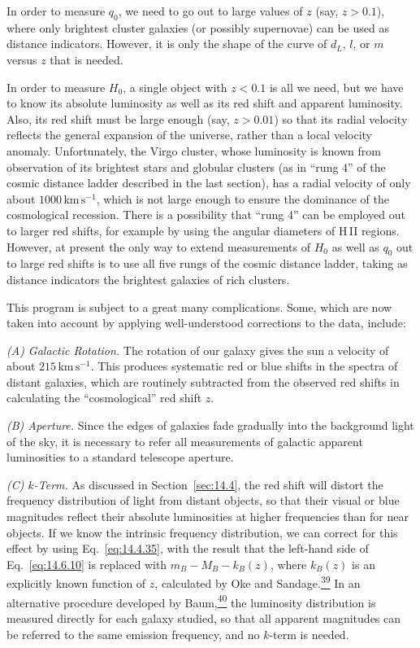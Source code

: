 In order to measure \(q_0\), we need to go out to large values of \(z\)
(say, \(z>0.1\)), where only brightest cluster galaxies (or possibly
supernovae) can be used as distance indicators. However, it is only the
shape of the curve of \(d_L\), \(l\), or \(m\) versus \(z\) that is needed.

In order to measure \(H_0\), a single object with \(z<0.1\) is all we need,
but we have to know its absolute luminosity as well as its red shift and
apparent luminosity. Also, its red shift must be large enough (say,
\(z>0.01\)) so that its radial velocity reflects the general expansion of
the universe, rather than a local velocity anomaly. Unfortunately, the Virgo
cluster, whose luminosity is known from observation of its brightest stars
and globular clusters (as in ``rung 4'' of the cosmic distance ladder
described in the last section), has a radial velocity of only about
\(1000\,\mathrm{km\,s^{-1}}\), which is not large enough to ensure the
dominance of the cosmological recession. There is a possibility that
``rung 4'' can be employed out to larger red shifts, for example by using the
angular diameters of H\,II regions. However, at present the only way to
extend measurements of \(H_0\) as well as \(q_0\) out to large red shifts is
to use all five rungs of the cosmic distance ladder, taking as distance
indicators the brightest galaxies of rich clusters.

This program is subject to a great many complications. Some, which are now
taken into account by applying well-understood corrections to the data,
include:

\medskip
\noindent\textit{(A) Galactic Rotation.}
The rotation of our galaxy gives the sun a velocity of about
\(215\,\mathrm{km\,s^{-1}}\). This produces systematic red or blue shifts
in the spectra of distant galaxies, which are routinely subtracted from the
observed red shifts in calculating the ``cosmological'' red shift \(z\).

\medskip
\noindent\textit{(B) Aperture.}
Since the edges of galaxies fade gradually into the background light of the
sky, it is necessary to refer all measurements of galactic apparent
luminosities to a standard telescope aperture.

\medskip
\noindent\textit{(C) \(k\)-Term.}
As discussed in Section~\ref{sec:14.4}, the red shift will distort the
frequency distribution of light from distant objects, so that their visual
or blue magnitudes reflect their absolute luminosities at higher frequencies
than for near objects. If we know the intrinsic frequency distribution, we
can correct for this effect by using Eq.~\eqref{eq:14.4.35}, with the result
that the left-hand side of Eq.~\eqref{eq:14.6.10} is replaced with
\(m_B-M_B-k_B(z)\), where \(k_B(z)\) is an explicitly known function of
\(z\), calculated by Oke and
Sandage.\hyperref[ch14-ref-39]{\textsuperscript{39}} In an alternative
procedure developed by Baum,\hyperref[ch14-ref-40]{\textsuperscript{40}} the
luminosity distribution is measured directly for each galaxy studied, so
that all apparent magnitudes can be referred to the same emission frequency,
and no \(k\)-term is needed.

